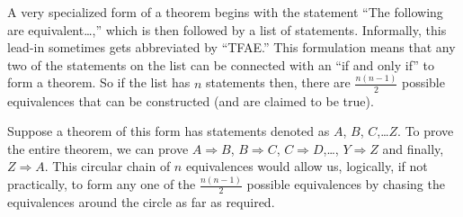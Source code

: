A very specialized form of a theorem begins with the statement ``The following are equivalent\dots,'' which is then followed by a list of statements.  Informally, this lead-in sometimes gets abbreviated by ``TFAE.''  This formulation means that any two of the statements on the list can be connected with an ``if and only if'' to form a theorem.  So if the list has $n$ statements then, there are $\tfrac{n(n-1)}{2}$ possible equivalences that can be constructed (and are claimed to be true).\par
%
Suppose a theorem of this form has statements denoted as $A$, $B$, $C$,\dots $Z$.  To prove the entire theorem, we can prove $A\Rightarrow B$, $B\Rightarrow C$, $C\Rightarrow D$,\dots, $Y\Rightarrow Z$ and finally, $Z\Rightarrow A$.  This circular chain of $n$ equivalences would allow us, logically, if not practically, to form any one of the $\tfrac{n(n-1)}{2}$ possible equivalences by chasing the equivalences around the circle as far as required.  
